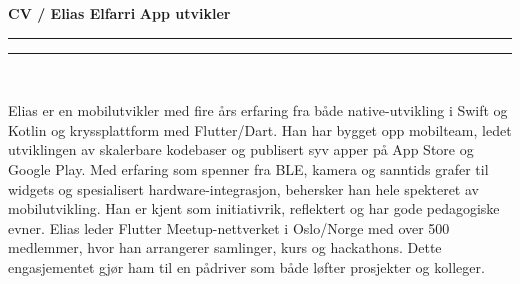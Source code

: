 \documentclass[a4paper,11pt]{article}
\begin{document}
\noindent \textbf{CV / Elias Elfarri} \hfill \textbf{App utvikler} \\
\rule{\linewidth}{0.5pt}


\vspace{3em}

\begin{paracol}{2}
\begin{flushleft}

    \vspace{1em}
    \noindent\rule{4cm}{10pt}
    

    \vspace{1.5em}
    {\Huge {}} \\
    \vspace{0.5em}
    
    \begin{tcolorbox}[
        colback=white,       %
        colframe=white,      %
        boxrule=0.0pt,       %
        arc=2mm,             %
        width=0.85\linewidth,%
        left=0mm, right=2mm, top=1mm, bottom=1mm %
        ]
    {\fontsize{12}{12}\selectfont 
    Elias er en mobilutvikler med 
    fire års erfaring fra både native-utvikling
     i Swift og Kotlin og kryssplattform med Flutter/Dart.
      Han har bygget opp mobilteam,
       ledet utviklingen av skalerbare
        kodebaser og publisert syv apper 
        på App Store og Google Play. 
        Med erfaring som spenner fra BLE,
         kamera og sanntids grafer til widgets 
         og spesialisert hardware-integrasjon,
          behersker han hele spekteret av
           mobilutvikling.
      Han er kjent som initiativrik, 
      reflektert og har gode pedagogiske evner.
       Elias leder Flutter Meetup-nettverket i 
       Oslo/Norge med over 500 medlemmer,
        hvor han arrangerer samlinger, 
        kurs og hackathons. 
        Dette engasjementet 
        gjør ham til en pådriver som både løfter
         prosjekter og kolleger.}
    \end{tcolorbox}
\end{flushleft}


\end{paracol}
\end{document}
